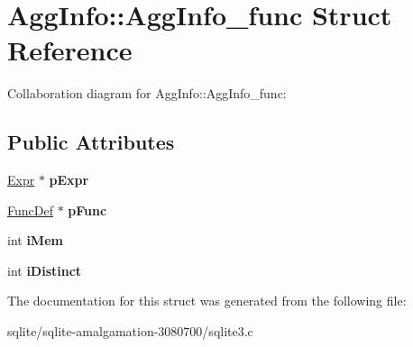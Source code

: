 \hypertarget{struct_agg_info_1_1_agg_info__func}{\section{Agg\+Info\+:\+:Agg\+Info\+\_\+func Struct Reference}
\label{struct_agg_info_1_1_agg_info__func}
}


Collaboration diagram for Agg\+Info\+:\+:Agg\+Info\+\_\+func\+:
\subsection*{Public Attributes}
\begin{DoxyCompactItemize}
\item 
\hypertarget{struct_agg_info_1_1_agg_info__func_a7b92e1c42e60d44e28ebf695316f4018}{\hyperlink{struct_expr}{Expr} $\ast$ {\bfseries p\+Expr}}\label{struct_agg_info_1_1_agg_info__func_a7b92e1c42e60d44e28ebf695316f4018}

\item 
\hypertarget{struct_agg_info_1_1_agg_info__func_a840478e8ec53cefa57b50228f6fdafe4}{\hyperlink{struct_func_def}{Func\+Def} $\ast$ {\bfseries p\+Func}}\label{struct_agg_info_1_1_agg_info__func_a840478e8ec53cefa57b50228f6fdafe4}

\item 
\hypertarget{struct_agg_info_1_1_agg_info__func_a41a8da36555c37fffc65f1acead49a4f}{int {\bfseries i\+Mem}}\label{struct_agg_info_1_1_agg_info__func_a41a8da36555c37fffc65f1acead49a4f}

\item 
\hypertarget{struct_agg_info_1_1_agg_info__func_a4a82635b0116eb44ec8ca9e47cc509d9}{int {\bfseries i\+Distinct}}\label{struct_agg_info_1_1_agg_info__func_a4a82635b0116eb44ec8ca9e47cc509d9}

\end{DoxyCompactItemize}


The documentation for this struct was generated from the following file\+:\begin{DoxyCompactItemize}
\item 
sqlite/sqlite-\/amalgamation-\/3080700/sqlite3.\+c\end{DoxyCompactItemize}
